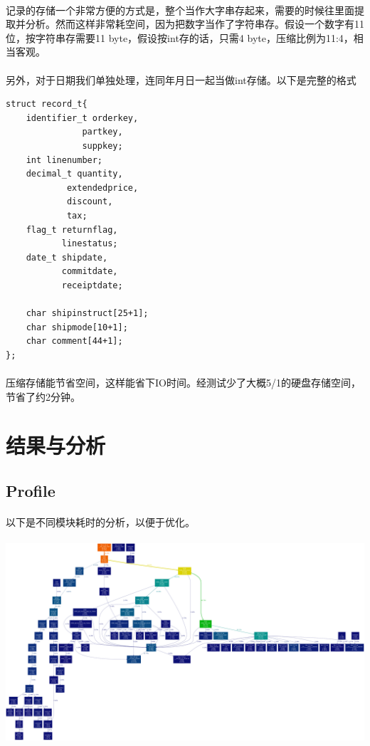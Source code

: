 \documentclass{article}
\begin{document}
\begin{enumerate}
                \paragraph{}
                    记录的存储一个非常方便的方式是，整个当作大字串存起来，需要的时候往里面提取并分析。然而这样非常耗空间，因为把数字当作了字符串存。假设一个数字有11位，按字符串存需要11 byte，假设按int存的话，只需4 byte，压缩比例为11:4，相当客观。
                \paragraph{}
                    另外，对于日期我们单独处理，连同年月日一起当做int存储。以下是完整的格式
\begin{verbatim}
struct record_t{
    identifier_t orderkey, 
               partkey, 
               suppkey;
    int linenumber;
    decimal_t quantity,
            extendedprice,
            discount,
            tax;
    flag_t returnflag,
           linestatus;
    date_t shipdate,
           commitdate,
           receiptdate;

    char shipinstruct[25+1];
    char shipmode[10+1];
    char comment[44+1];
};
\end{verbatim}
                \paragraph{}
                    压缩存储能节省空间，这样能省下IO时间。经测试少了大概5/1的硬盘存储空间，节省了约2分钟。
        \end{enumerate}
\section{结果与分析}
    \subsection{Profile}
        \paragraph{}
            以下是不同模块耗时的分析，以便于优化。
        \paragraph{}\includegraphics[scale=0.5]{proff_big_record_perf.png}
\end{document}
